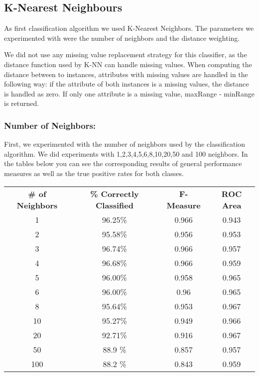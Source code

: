 \documentclass{article}
\begin{document}
\subsection{K-Nearest Neighbours}
As first classification algorithm we used K-Nearest Neighbors. The parameters we experimented with were the number of neighbors and the distance weighting.

We did not use any missing value replacement strategy for this classifier, as the distance function used by K-NN can handle missing values. When computing the distance between to instances, attributes with missing values are handled in the following way: if the attribute of both instances is a missing values, the distance is handled as zero. If only one attribute is a missing value, maxRange - minRange is returned. 

\subsubsection{Number of Neighbors:}
First, we experimented with the number of neighbors used by the classification algorithm. We did experiments with 1,2,3,4,5,6,8,10,20,50 and 100 neighbors. In the tables below you can see the corresponding results of general performance measures as well as the true positive rates for both classes.

\begin{center}
\begin{tabular}{ c | c | c | c}
\textbf{\# of Neighbors} & \textbf{\% Correctly Classified} & \textbf{F-Measure} & \textbf{ROC Area}\\
1   & 96.25\% & 0.966 & 0.943\\
2   & 95.58\% & 0.956 & 0.953\\
3   & 96.74\% & 0.966 & 0.957\\
4   & 96.68\% & 0.966 & 0.959\\
5   & 96.00\% & 0.958 & 0.965\\
6   & 96.00\% & 0.96  & 0.965\\
8   & 95.64\% & 0.953 & 0.967\\
10  & 95.27\% & 0.949 & 0.966\\
20  & 92.71\% & 0.916 & 0.967\\
50  & 88.9 \% & 0.857 & 0.957\\
100 & 88.2 \% & 0.843 & 0.959\\
\end{tabular}
\end{center}
\end{document}
